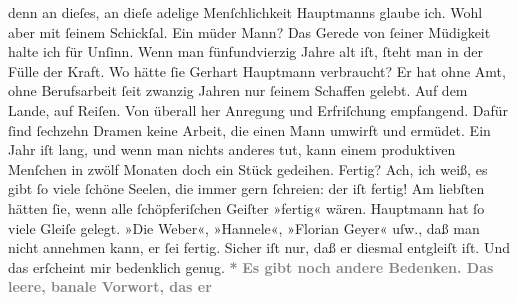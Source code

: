 \begin{ledgroupsized}[t]{13cm}
{{                  denn an dieſes, an dieſe adelige Menſchlichkeit Hauptmanns glaube ich. Wohl aber mit ſeinem Schickſal. Ein müder Mann?
                  Das Gerede von ſeiner Müdigkeit halte ich für Unſinn. Wenn man fünfundvierzig
                  Jahre alt iſt, ſteht man in der Fülle der Kraft. Wo hätte ſie Gerhart Hauptmann verbraucht? Er hat ohne Amt, ohne
                  Berufsarbeit ſeit zwanzig Jahren nur ſeinem Schaffen gelebt. Auf dem Lande, auf
                  Reiſen. Von überall her Anregung und Erfriſchung empfangend. Dafür ſind ſechzehn
                  Dramen keine Arbeit, die einen Mann umwirft und ermüdet. Ein Jahr iſt lang, und
                  wenn man nichts anderes tut, kann einem produktiven Menſchen in zwölf Monaten doch
                  ein Stück gedeihen. Fertig? Ach, ich weiß, es gibt ſo viele ſchöne Seelen, die
                  immer gern ſchreien: der iſt fertig! Am liebſten hätten ſie, wenn alle
                  ſchöpferiſchen Geiſter »fertig« wären. Hauptmann hat ſo viele Gleiſe gelegt. »Die Weber«, »Hannele«, »Florian Geyer« uſw., daß man nicht annehmen
                  kann, er ſei fertig. Sicher iſt nur, daß er diesmal entgleiſt iſt. Und das
                  erſcheint mir bedenklich genug.}}\pend
           \pstart
           \centering{}\textcolor{gray}{\textbf{*}}\pend
           \pstart
           \noindent{}\textcolor{gray}{\textbf{Es gibt noch andere Bedenken. Das leere, banale Vorwort, das er
}}
\end{ledgroupsized}
